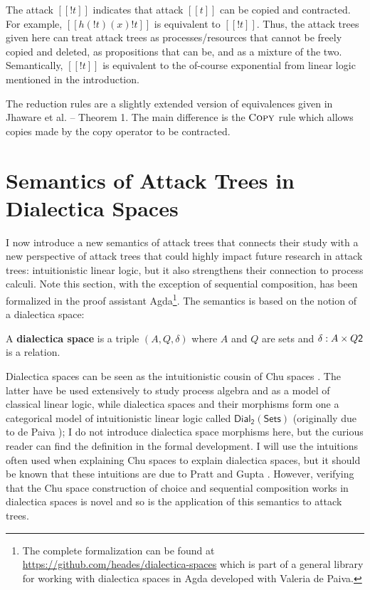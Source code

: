 \documentclass{llncs}
\let\to\relax
\newcommand{\to}{\rightarrow}
\newcommand{\dial}[0]{\mathsf{Dial_2}(\mathsf{Sets})}
\begin{document}
The attack $[[! t]]$ indicates that attack $[[t]]$ can be copied and
contracted.  For example, $[[h(!t) (x) !t]]$ is equivalent to $[[!
    t]]$.  Thus, the attack trees given here can treat attack trees as
processes/resources that cannot be freely copied and deleted, as
propositions that can be, and as a mixture of the two.  Semantically,
$[[! t]]$ is equivalent to the of-course exponential from linear logic
mentioned in the introduction.

The reduction rules are a slightly extended version of equivalences
given in Jhaware et al. \cite{Jhawar:2015} -- Theorem 1.  The main
difference is the $\textsc{Copy}$ rule which allows copies made by the
copy operator to be contracted.

\section{Semantics of Attack Trees in Dialectica Spaces}
\label{sec:concrete_semantics_of_attack_trees_in_dialectica_spaces}

I now introduce a new semantics of attack trees that connects their
study with a new perspective of attack trees that could highly impact
future research in attack trees: intuitionistic linear logic, but it
also strengthens their connection to process calculi.  Note this
section, with the exception of sequential composition, has been
formalized in the proof assistant Agda\footnote{The complete
  formalization can be found at
  \url{https://github.com/heades/dialectica-spaces} which is part of a
  general library for working with dialectica spaces in Agda developed
  with Valeria de Paiva.}.  The semantics is based on the notion of a
dialectica space:

\begin{definition}
  \label{def:dialectica-space}
  A \textbf{dialectica space} is a triple $(A, Q, \delta)$ where $A$
  and $Q$ are sets and $\delta : A \times Q \to \mathsf{2}$ is a
  relation.
\end{definition}

Dialectica spaces can be seen as the intuitionistic cousin
\cite{dePaiva:2006b} of Chu spaces \cite{Pratt:1999}.  The latter have
be used extensively to study process algebra and as a model of
classical linear logic, while dialectica spaces and their morphisms
form one a categorical model of intuitionistic linear logic called
$\dial$ (originally due to de Paiva \cite{dePaiva:1987}); I do not
introduce dialectica space morphisms here, but the curious reader can
find the definition in the formal development. I will use the
intuitions often used when explaining Chu spaces to explain dialectica
spaces, but it should be known that these intuitions are due to Pratt
and Gupta \cite{Gupta:1994}.  However, verifying that the Chu space
construction of choice and sequential composition works in dialectica
spaces is novel and so is the application of this semantics to attack
trees.
\end{document}
